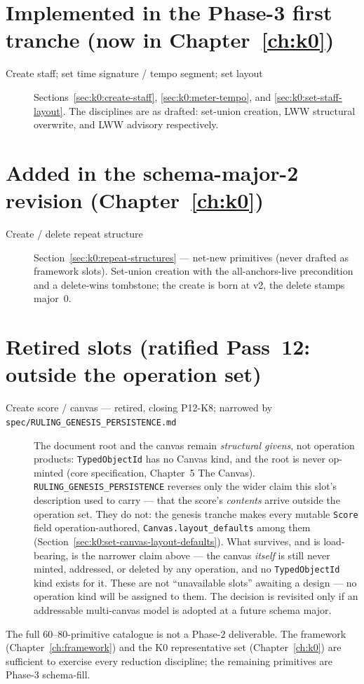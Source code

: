 \documentclass[11pt,letterpaper]{report}
\newcommand{\sectionsc}[1]{{\addfontfeatures{Letters=SmallCaps}#1}}
\begin{document}
\section*{Implemented in the Phase-3 first tranche (now in Chapter~\ref{ch:k0})}

\begin{description}
  \item[Create staff; set time signature / tempo segment; set layout]
    Sections~\ref{sec:k0:create-staff}, \ref{sec:k0:meter-tempo}, and
    \ref{sec:k0:set-staff-layout}. The disciplines are as drafted: set-union
    creation, LWW structural overwrite, and LWW advisory respectively.
\end{description}

\section*{Added in the schema-major-2 revision (Chapter~\ref{ch:k0})}

\begin{description}
  \item[Create / delete repeat structure]
    Section~\ref{sec:k0:repeat-structures} --- net-new primitives (never
    drafted as framework slots). Set-union creation with the
    all-anchors-live precondition and a delete-wins tombstone; the create
    is born at v2, the delete stamps major~0.
\end{description}

\section*{Retired slots (ratified Pass~12: outside the operation set)}

\begin{description}
  \item[Create score / canvas --- retired, closing P12-K8; narrowed by
    \texttt{spec/RULING\_GENESIS\_PERSISTENCE.md}]
    The document root and the canvas remain \emph{structural givens}, not
    operation products: \texttt{TypedObjectId} has no Canvas kind, and the
    root is never op-minted (core specification, Chapter~5
    \sectionsc{The Canvas}). \texttt{RULING\_GENESIS\_PERSISTENCE} reverses
    only the wider claim this slot's description used to carry --- that the
    score's \emph{contents} arrive outside the operation set. They do not:
    the genesis tranche makes every mutable \texttt{Score} field
    operation-authored, \texttt{Canvas.layout\_defaults} among them
    (Section~\ref{sec:k0:set-canvas-layout-defaults}). What survives, and is
    load-bearing, is the narrower claim above --- the canvas \emph{itself} is
    still never minted, addressed, or deleted by any operation, and no
    \texttt{TypedObjectId} kind exists for it. These are not ``unavailable
    slots'' awaiting a design --- no operation kind will be assigned to them.
    The decision is revisited only if an addressable multi-canvas model is
    adopted at a future schema major.
\end{description}

\begin{nongoal}
The full $60$--$80$-primitive catalogue is not a Phase-2 deliverable. The
framework (Chapter~\ref{ch:framework}) and the K0 representative set
(Chapter~\ref{ch:k0}) are sufficient to exercise every reduction discipline; the
remaining primitives are Phase-3 schema-fill.
\end{nongoal}
\end{document}
